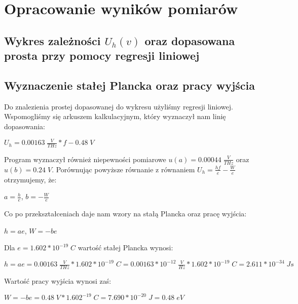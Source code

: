 \documentclass[12pt]{article}
\begin{document}
\section{Opracowanie wyników pomiarów}
\subsection{Wykres zależności $U_h(v)$ oraz dopasowana prosta przy pomocy regresji liniowej}
\begin{center}
\end{center}
\subsection{Wyznaczenie stałej Plancka oraz pracy wyjścia}
Do znalezienia prostej dopasowanej do wykresu użyliśmy regresji liniowej. Wspomogliśmy się arkuszem kalkulacyjnym, który wyznaczył nam linię dopasowania:
\begin{center}
\Large $U_h=0.00163\;\frac{V}{THz}*f-0.48\;V$
\end{center}
Program wyznaczył również niepewności pomiarowe $u(a)=0.00044\;\frac{V}{THz}$ oraz $u(b)=0.24\;V$. \newline
Porównując powyższe równanie z równaniem $U_h=\frac{hf}{e}-\frac{W}{e}$ otrzymujemy, że:
\begin{center}
\Large $a=\frac{h}{e}$,   $b=-\frac{W}{e}$
\end{center}
Co po przekształceniach daje nam wzory na stałą Plancka oraz pracę wyjścia:
\begin{center}
\Large $h=ae$,   $W=-be$
\end{center} \newpage \noindent
Dla $e=1.602*10^{-19}\;C$ wartość stałej Plancka wynosi:
\begin{center}
\Large $h=ae=0.00163\;\frac{V}{THz}*1.602*10^{-19}\;C=0.00163*10^{-12}\;\frac{V}{Hz}*1.602*10^{-19}\;C=2.611*10^{-34}\;Js$
\end{center}
Wartość pracy wyjścia wynosi zaś:
\begin{center}
\Large $W=-be=0.48\;V*1.602^{-19}\;C=7.690*10^{-20}\;J=0.48\;eV$
\end{center}
\end{document}
